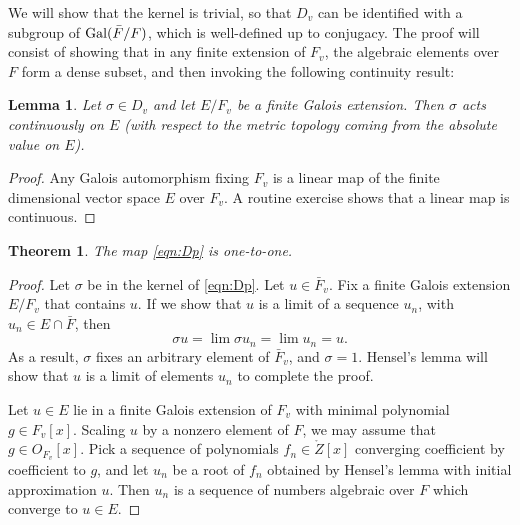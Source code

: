 \documentclass{amsart}
\newtheorem{theorem}[equation]{Theorem}
\newtheorem{lemma}[equation]{Lemma}
\newtheorem{exercise}{Exercise}
\def\abs#1{{|#1|}}
\begin{document}
We will show that the kernel is trivial, so that $D_v$ can be
identified with a subgroup of ${\operatorname{Gal}}(\bar{F}/F)$,
which is well-defined up to conjugacy.  The proof will consist of
showing that in any finite extension of $F_v$, the algebraic
elements over $F$ form a dense subset, and then invoking the
following continuity result:

\begin{lemma} Let $\sigma\in D_v$ and let $E/F_v$ be a finite Galois extension. 
Then $\sigma$ acts continuously on $E$ (with respect to the metric topology coming
from the absolute value on $E$).
\end{lemma}

\begin{proof}  Any Galois automorphism fixing $F_v$ is a linear map of
the finite dimensional vector space $E$ over $F_v$.  A routine exercise
shows that a linear map is continuous.
\end{proof}

\begin{theorem} The map \eqref{eqn:Dp} is one-to-one.
\end{theorem}

\begin{proof}
  Let $\sigma$ be in the kernel of \eqref{eqn:Dp}.  Let $u\in
  \bar{F}_v$.  Fix a finite Galois extension $E/F_v$
  that contains $u$.  If we show that $u$ is a limit of a sequence
  $u_n$, with $u_n\in E\cap \bar{F}$, then
\[
\sigma u = \lim \sigma u_n = \lim u_n = u.
\]
As a result, $\sigma$ fixes an arbitrary element of
$\bar{F}_v$, and $\sigma=1$.  Hensel's lemma will show
that $u$ is a limit of elements $u_n$ to complete the proof.


Let $u\in E$ lie in a finite Galois
extension of $F_v$ with minimal polynomial $g\in F_v[x]$.  Scaling
$u$ by a nonzero element of $F$, we may assume that $g\in O_{F_v}[x]$.  Pick a sequence
of polynomials $f_n\in\ring{Z}[x]$ converging coefficient by coefficient to 
$g$, and let $u_n$ be a root of $f_n$ obtained by Hensel's lemma with initial
approximation $u$.  Then $u_n$ is a sequence of numbers algebraic over $F$
which converge to $u\in E$.
\end{proof}


\end{document}
